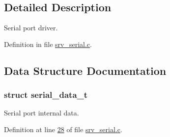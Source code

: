 \subsection{Detailed Description}
Serial port driver. 



Definition in file \hyperlink{a00030_source}{srv\+\_\+serial.\+c}.



\subsection{Data Structure Documentation}
\label{d8/db4/a00760}
\hypertarget{a00030_d8/db4/a00760}{}
\subsubsection{struct serial\+\_\+data\+\_\+t}
Serial port internal data. 

Definition at line \hyperlink{a00030_source_l00028}{28} of file \hyperlink{a00030_source}{srv\+\_\+serial.\+c}.



